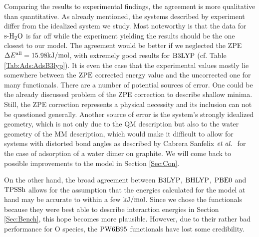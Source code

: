 Comparing the results to experimental findings, the agreement is more qualitative
than quantitative. As already mentioned, the systems described by experiment
differ from the idealized system we study. Most noteworthy is that the data for $\text{s-}\text H _2 \text O$
is far off while the experiment yielding the results should be the one closest
to our model. The agreement would be better if we neglected the
ZPE $\Delta E^{\text{all}}=15.98\text {kJ/mol}$, with extremely good results for $\text{B3LYP}$ (cf. Table
\ref{Tab:Ads:AdsB3lyp}).
It is even the case that the experimental values mostly lie somewhere between
the $\text{ZPE}$ corrected energy value and the uncorrected one for many functionals.
There are a number of potential sources of error. One could be the already
discussed problem of the ZPE correction to describe shallow minima. Still,
the ZPE correction represents a physical necessity and its inclusion can not
be questioned generally.
Another source of error is the system's strongly
idealized geometry, which is not only due to the QM description but also to
the water geometry of the MM description, which would make it difficult to
allow for systems with distorted bond angles as described by Cabrera Sanfelix $\emph{et al.}~$ 
for the case of adsorption of a water dimer on
graphite.\cite{CabreraSanfelix2003}
We will come back to possible improvements to the model in Section
\ref{Sec:Con}.


On the other hand, the broad agreement between $\text{B3LYP}$, $\text{BHLYP}$, $\text{PBE0}$
and $\text{TPSSh}$ allows for the assumption that the energies calculated for the
model at hand may be accurate to within a few $\text {kJ/mol}$. Since we chose
the functionals because they were best able to describe interaction
energies in Section \ref{Sec:Bench}, this hope becomes more plausible.
However, due to their rather bad performance for O species, the $\text{PW6B95}$
functionals have lost some credibility.



